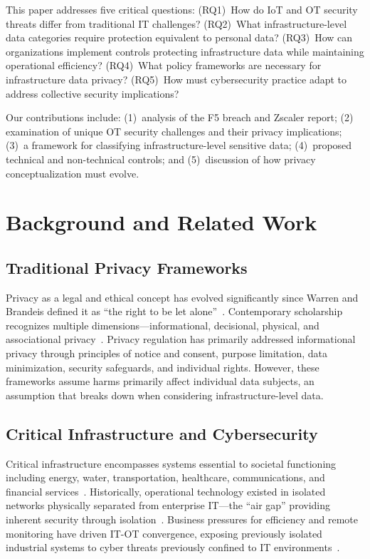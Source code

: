 \documentclass[sigconf,nonacm]{acmart}
\begin{document}
This paper addresses five critical questions: (RQ1)~How do IoT and OT security threats
differ from traditional IT challenges? (RQ2)~What infrastructure-level data categories
require protection equivalent to personal data? (RQ3)~How can organizations implement
controls protecting infrastructure data while maintaining operational efficiency?
(RQ4)~What policy frameworks are necessary for infrastructure data privacy?
(RQ5)~How must cybersecurity practice adapt to address collective security implications?

Our contributions include: (1)~analysis of the F5 breach and Zscaler report; (2)~
examination of unique OT security challenges and their privacy implications; (3)~a
framework for classifying infrastructure-level sensitive data; (4)~proposed technical
and non-technical controls; and (5)~discussion of how privacy conceptualization must
evolve.

\section{Background and Related Work}

\subsection{Traditional Privacy Frameworks}

Privacy as a legal and ethical concept has evolved significantly since Warren and
Brandeis defined it as ``the right to be let alone''~\cite{warren1890right}. Contemporary
scholarship recognizes multiple dimensions---informational, decisional, physical, and
associational privacy~\cite{solove2023understanding}. Privacy regulation has primarily
addressed informational privacy through principles of notice and consent, purpose
limitation, data minimization, security safeguards, and individual rights. However,
these frameworks assume harms primarily affect individual data subjects, an assumption
that breaks down when considering infrastructure-level data.

\subsection{Critical Infrastructure and Cybersecurity}

Critical infrastructure encompasses systems essential to societal functioning including
energy, water, transportation, healthcare, communications, and financial
services~\cite{cisa2023infrastructure}. Historically, operational technology existed in
isolated networks physically separated from enterprise IT---the ``air gap'' providing
inherent security through isolation~\cite{stouffer2023ot}. Business pressures for
efficiency and remote monitoring have driven IT-OT convergence, exposing previously
isolated industrial systems to cyber threats previously confined to IT
environments~\cite{lee2025dangerous}.
\end{document}
